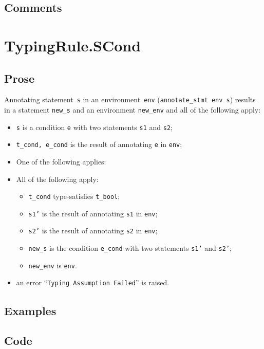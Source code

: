 \documentclass{book}
\begin{document}
  \subsection{Comments}

\section{TypingRule.SCond \label{sec:TypingRule.SCond}}

  \subsection{Prose}
Annotating statement~\texttt{s} in an environment~\texttt{env}
(\texttt{annotate\_stmt env s}) results in a statement \texttt{new\_s} and an
environment \texttt{new\_env} and all of the following apply:
   \begin{itemize}
   \item \texttt{s} is a condition \texttt{e} with two statements \texttt{s1} and \texttt{s2};
   \item \texttt{t\_cond, e\_cond} is the result of annotating \texttt{e} in \texttt{env};
   \item One of the following applies:
     \item All of the following apply:
       \begin{itemize}
       \item \texttt{t\_cond} type-satisfies \texttt{t\_bool}; 
       \item \texttt{s1'} is the result of annotating \texttt{s1} in \texttt{env};
       \item \texttt{s2'} is the result of annotating \texttt{s2} in \texttt{env};
       \item \texttt{new\_s} is the condition \texttt{e\_cond} with two statements \texttt{s1'} and \texttt{s2'};
       \item \texttt{new\_env} is \texttt{env}.
       \end{itemize}
     \item an error ``\texttt{Typing Assumption Failed}'' is raised.
   \end{itemize}

  \subsection{Examples}

  \subsection{Code}
\end{document}
